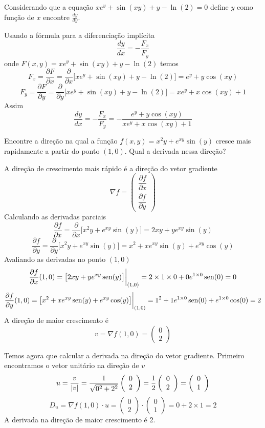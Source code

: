 \documentclass[a4paper,12pt,fleqn]{article}
\newcommand{\D}[2]{\frac{\partial {#1}}{\partial {#2}}}
\newcommand{\vetor}[2]{\left(\begin{array}{c} #1 \\ #2 \end{array}\right)}
\begin{document}

Considerando que a equação
\(
  xe^y + \sin(xy) + y - \ln(2) = 0
\)
define $y$ como função de $x$ encontre \(\frac{dy}{dy}\).

\begin{answer}
  Usando a fórmula para a diferenciação implícita
  \[
    \frac{dy}{dx} = -\frac{F_x}{F_y}
  \]
  onde \(F(x, y) = xe^y + \sin(xy) + y - \ln(2)\) temos
  \[
    F_x
    = \D{F}{x}
    = \D{}{x}\big[xe^y + \sin(xy) + y - \ln(2)\big]
    = e^y + y\cos(xy)
  \]
  \[
    F_y
    = \D{F}{y}
    = \D{}{y}\big[xe^y + \sin(xy) + y - \ln(2)\big]
    = xe^y + x\cos(xy) + 1
  \]
  Assim
  \[
    \frac{dy}{dx}
    = -\frac{F_x}{F_y}
    = -\frac{e^y + y\cos(xy)}{xe^y + x\cos(xy) + 1}
  \]
  \clearpage
\end{answer}

Encontre a direção na qual a função
\(
  f(x, y) = x^2y + e^{xy}\sin(y)
\)
cresce mais rapidamente a partir do ponto
\((1, 0)\).
Qual a derivada nessa direção?

\begin{answer}
  A direção de crescimento mais rápido é a direção do vetor gradiente
  \[
    \nabla f
    = \left(\begin{array}{c}
      \dfrac{\partial f}{\partial x} \\[4mm]
      \dfrac{\partial f}{\partial y}
    \end{array}\right)
  \]
  Calculando as derivadas parciais
  \[
    \D{f}{x}
    = \D{}{x}\big[x^2y + e^{xy}\sin(y)\big]
    = 2xy + ye^{xy}\sin(y)
  \]
  \[
    \D{f}{y}
    = \D{}{y}\big[x^2y + e^{xy}\sin(y)\big]
    = x^2 + xe^{xy}\sin(y) + e^{xy}\cos(y)
  \]
  Avaliando as derivadas no ponto $(1, 0)$
  \[
    \D{f}{x}(1, 0)
    = \big[2xy + ye^{xy}\sin(y)\big]\evalat{(1, 0)}{}
    = 2\times 1 \times 0 + 0 e^{1\times 0} \sin(0)
    = 0
  \]
  \[
    \D{f}{y}(1, 0)
    = \big[x^2 + xe^{xy}\sin(y) + e^{xy}\cos(y)\big]\evalat{(1, 0)}{}
    = 1^2 + 1 e^{1\times 0} \sin(0) + e^{1\times 0}\cos(0)
    = 2
  \]
  A direção de maior crescimento é
  \[
    v = \nabla f(1, 0) = \vetor{0}{2}
  \]

  Temos agora que calcular a derivada na direção do vetor gradiente.
  Primeiro encontramos o vetor unitário na direção de $v$
  \[
    u
    = \frac{v}{\abs{v}}
    = \frac{1}{\sqrt{0^2 + 2^2}}\vetor{0}{2}
    = \frac{1}{2}\vetor{0}{2}
    = \vetor{0}{1}
  \]
  \[
    D_u
    = \nabla f(1, 0) \cdot u
    = \vetor{0}{2} \cdot \vetor{0}{1}
    = 0 + 2 \times 1
    = 2
  \]
  A derivada na direção de maior crescimento é 2.
  \clearpage
\end{answer}
\end{document}

